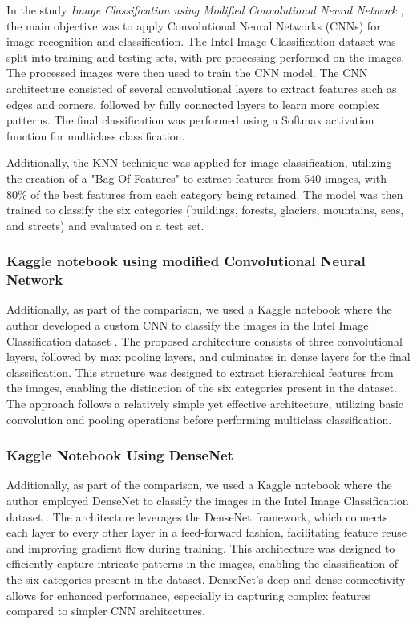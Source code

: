 In the study \textit{Image Classification using Modified Convolutional Neural Network} \cite{khan2024image}, the main objective was to apply Convolutional Neural Networks (CNNs) for image recognition and classification. The Intel Image Classification dataset was split into training and testing sets, with pre-processing performed on the images. The processed images were then used to train the CNN model. The CNN architecture consisted of several convolutional layers to extract features such as edges and corners, followed by fully connected layers to learn more complex patterns. The final classification was performed using a Softmax activation function for multiclass classification.

Additionally, the KNN technique was applied for image classification, utilizing the creation of a "Bag-Of-Features" to extract features from 540 images, with 80\% of the best features from each category being retained. The model was then trained to classify the six categories (buildings, forests, glaciers, mountains, seas, and streets) and evaluated on a test set.

\subsubsection{Kaggle notebook using modified Convolutional Neural Network}

Additionally, as part of the comparison, we used a Kaggle notebook where the author developed a custom CNN to classify the images in the Intel Image Classification dataset \cite{kaggle2024intel}. The proposed architecture consists of three convolutional layers, followed by max pooling layers, and culminates in dense layers for the final classification. This structure was designed to extract hierarchical features from the images, enabling the distinction of the six categories present in the dataset. The approach follows a relatively simple yet effective architecture, utilizing basic convolution and pooling operations before performing multiclass classification.


\subsubsection{Kaggle Notebook Using DenseNet}

Additionally, as part of the comparison, we used a Kaggle notebook where the author employed DenseNet to classify the images in the Intel Image Classification dataset \cite{kaggle2023densenet}. The architecture leverages the DenseNet framework, which connects each layer to every other layer in a feed-forward fashion, facilitating feature reuse and improving gradient flow during training. This architecture was designed to efficiently capture intricate patterns in the images, enabling the classification of the six categories present in the dataset. DenseNet's deep and dense connectivity allows for enhanced performance, especially in capturing complex features compared to simpler CNN architectures.